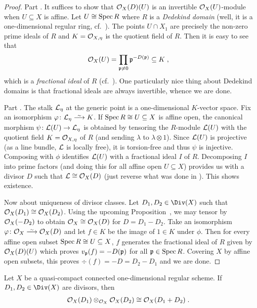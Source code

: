 \documentclass[a4paper,parskip=half,numbers=enddot, DIV=12]{scrreprt}
\begin{document}
\begin{proof}
	Part . It suffices to show that $\mathcal{O}_X(D)(U)$ is an invertible $\mathcal{O}_X(U)$-module when $U\subseteq X$ is affine. Let $U\cong \operatorname{Spec} R$ where $R$ is a \emph{Dedekind domain} (well, it is a one-dimensional regular ring, cf.\ \cite[Theorem~22]{alg2}). The points $U\cap X_1$ are precisely the non-zero prime ideals of $R$ and $K=\mathcal{O}_{X,\eta}$ is the quotient field of $R$. Then it is easy to see that
	\begin{align*}
		\mathcal{O}_X(U)=\prod_{\mathfrak{p}\neq 0}\mathfrak{p}^{-D(\mathfrak{p})}\subseteq K\;,
	\end{align*}
	which is a \emph{fractional ideal} of $R$ (cf.\ \cite[Definition~3.5.3]{alg2}). One particularly nice thing about Dedekind domains is that fractional ideals are always invertible, whence we are done.
	
	Part . The stalk $\mathcal{L}_\eta$ at the generic point is a one-dimensional $K$-vector space. Fix an isomorphism $\phi\colon \Ll_\eta\isomorphism K$. If $\operatorname{Spec} R\cong U\subseteq X$ is affine open, the canonical morphism $\psi\colon \Ll(U)\morphism \Ll_\eta$ is obtained by tensoring the $R$-module $\mathcal{L}(U)$ with the quotient field $K=\mathcal{O}_{X,\eta}$ of $R$ (and sending $\lambda$ to $\lambda\otimes 1$). Since $\mathcal{L}(U)$ is projective (as a line bundle, $\mathcal{L}$ is locally free), it is torsion-free and thus $\psi$ is injective. Composing with $\phi$ identifies $\mathcal{L}(U)$ with a fractional ideal $I$ of $R$. Decomposing $I$ into prime factors (and doing this for all affine open $U\subseteq X$) provides us with a divisor $D$ such that $\mathcal{L}\cong\mathcal{O}_X(D)$ (just reverse what was done in ). This shows existence.
	
	Now about uniqueness of divisor classes. Let $D_1,D_2\in\Div(X)$ such that $\mathcal{O}_X(D_1)\cong \mathcal{O}_X(D_2)$. Using the upcoming Proposition~, we may tensor by $\mathcal{O}_X(-D_2)$ to obtain $\mathcal{O}_X\cong \mathcal{O}_X(D)$ for $D=D_1-D_2$. Take an isomorphism $\phi\colon \Oo_X\isomorphism\Oo_X(D)$ and let $f\in K$ be the image of $1\in K$ under $\phi$. Then for every affine open subset $\operatorname{Spec} R\cong U\subseteq X$, $f$ generates the fractional ideal of $R$ given by $\mathcal{O}_X(D)(U)$ which proves $v_{\mathfrak{p}}(f)=-D(\mathfrak{p})$ for all $\mathfrak{p}\in\operatorname{Spec} R$. Covering $X$ by affine open subsets, this proves $\div(f)=-D=D_2-D_1$ and we are done.
\end{proof}
\begin{prop}
	Let $X$ be a quasi-compact connected one-dimensional regular scheme. If $D_1,D_2\in\Div(X)$ are divisors, then 
	\begin{align*}
		\mathcal{O}_X(D_1)\otimes_{\mathcal{O}_X}\mathcal{O}_X(D_2)\cong\mathcal{O}_X(D_1+D_2)\;.
	\end{align*}
\end{prop}
\end{document}
